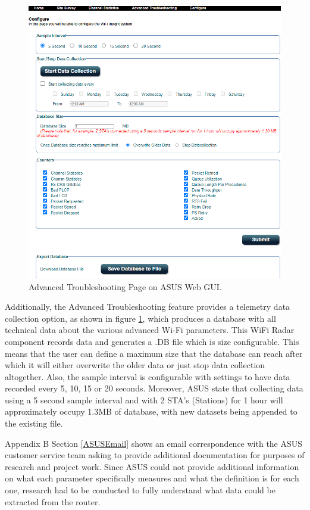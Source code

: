 \begin{figure} [ht]
    \centering
    \includegraphics[width=1\linewidth]{pages/Chapter2/Chapter 2 images/WiFiRadarSetting.PNG}
    \caption{Advanced Troubleshooting Page on ASUS Web GUI.}
    \label{fig_WiFiRadar}
\end{figure}

Additionally, the Advanced Troubleshooting feature provides a telemetry data collection option, as shown in figure \ref{fig_WiFiRadar}, which produces a database with all technical data about the various advanced Wi-Fi parameters. This WiFi Radar component records data and generates a .DB file which is size configurable. This means that the user can define a maximum size that the database can reach after which it will either overwrite the older data or just stop data collection altogether. Also, the sample interval is configurable with settings to have data recorded every 5, 10, 15 or 20 seconds. Moreover, ASUS state that collecting data using a 5 second sample interval and with 2 STA’s (Stations) for 1 hour will approximately occupy 1.3MB of database, with new datasets being appended to the existing file. 

Appendix B Section \ref{ASUSEmail} shows an email correspondence with the ASUS customer service team asking to provide additional documentation for purposes of research and project work. Since ASUS could not provide additional information on what each parameter specifically measures and what the definition is for each one, research had to be conducted to fully understand what data could be extracted from the router.

